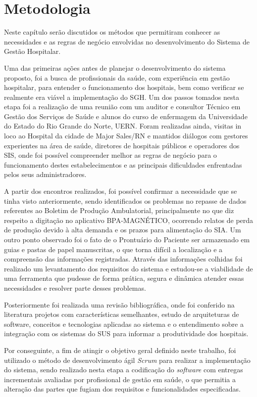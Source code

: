 \chapter{Metodologia}

Neste capítulo serão discutidos os métodos que permitiram conhecer as necessidades e as regras de negócio envolvidas no desenvolvimento do Sistema de Gestão
Hospitalar.

Uma das primeiras ações antes de planejar o desenvolvimento do sistema proposto, foi a busca de profissionais da saúde, com experiência em gestão hospitalar, para entender o funcionamento dos hospitais, bem como verificar se realmente era viável a implementação do SGH.
Um dos passos tomados nesta etapa foi a realização de uma reunião com um auditor e consultor Técnico em Gestão dos Serviços de Saúde e alunos do curso de enfermagem da Universidade do Estado do Rio Grande do Norte, UERN. Foram realizadas ainda, visitas in loco ao
Hospital da cidade de Major Sales/RN e mantidos diálogos com gestores experientes na área de saúde,
diretores de hospitais públicos e operadores dos SIS, onde foi possível compreender melhor as regras de negócio para o funcionamento destes estabelecimentos e as principais
dificuldades enfrentadas pelos seus administradores.

A partir dos encontros realizados, foi possível confirmar a necessidade que se tinha visto anteriormente, sendo identificados os problemas no repasse de dados referentes ao Boletim de Produção Ambulatorial, principalmente no que diz respeito a digitação no aplicativo BPA-MAGNÉTICO, ocorrendo relatos de perda de produção devido à alta demanda e os prazos para alimentação do SIA. Um outro ponto observado foi o fato de o Prontuário do Paciente ser armazenado em guias e pastas de papel manuscritas, o que torna difícil a localização e a compreensão das informações registradas. Através das informações colhidas foi realizado um levantamento dos requisitos do sistema e estudou-se a viabilidade de uma ferramenta que pudesse de forma prática, segura e dinâmica atender essas necessidades e resolver parte desses problemas.

Posteriormente foi realizada uma revisão bibliográfica, onde foi conferido na literatura projetos com características semelhantes, estudo de arquiteturas de software, conceitos e tecnologias aplicadas ao sistema e o entendimento sobre a integração com os sistemas do SUS para informar a produtividade dos hospitais.

Por conseguinte, a fim de atingir o objetivo geral definido neste trabalho, foi utilizado o método de desenvolvimento ágil \textit{Scrum} para realizar a implementação do sistema, sendo realizado nesta etapa a codificação do \textit{software} com entregas incrementais avaliadas por profissional de gestão em saúde, o que permitia a alteração das partes que fugiam dos requisitos e funcionalidades especificadas.


